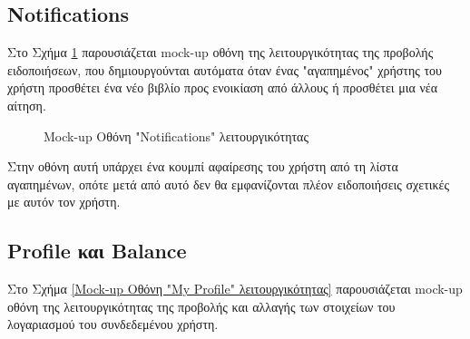 \documentclass[12pt,a4paper]{article}
\begin{document}
\subsection{Notifications}

Στο Σχήμα \ref{Mock-up Οθόνη "Notifications" λειτουργικότητας} παρουσιάζεται mock-up οθόνη της λειτουργικότητας της προβολής ειδοποιήσεων, που δημιουργούνται αυτόματα όταν ένας "αγαπημένος" χρήστης του χρήστη προσθέτει ένα νέο βιβλίο προς ενοικίαση από άλλους ή προσθέτει μια νέα αίτηση.

\begin{figure}[H]
	\caption{Mock-up Οθόνη "Notifications" λειτουργικότητας}
	\label{Mock-up Οθόνη "Notifications" λειτουργικότητας}
\end{figure}

Στην οθόνη αυτή υπάρχει ένα κουμπί αφαίρεσης του χρήστη από τη λίστα αγαπημένων, οπότε μετά από αυτό δεν θα εμφανίζονται πλέον ειδοποιήσεις σχετικές με αυτόν τον χρήστη.

\subsection{Profile και Balance}

Στο Σχήμα \ref{Mock-up Οθόνη "My Profile" λειτουργικότητας} παρουσιάζεται mock-up οθόνη της λειτουργικότητας της προβολής και αλλαγής των στοιχείων του λογαριασμού του συνδεδεμένου χρήστη.
\end{document}

